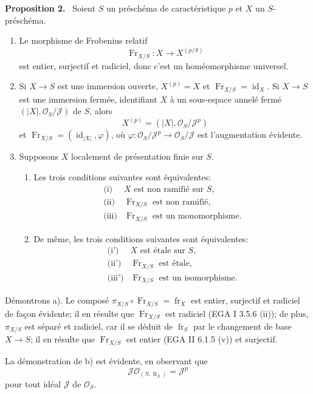 \documentclass[11pt]{article}
\newenvironment{statement}[1]{\par\medskip\noindent\textbf{#1.}\ }{\par\medskip}
\providecommand{\OO}{\mathcal{O}}
\providecommand{\id}{\operatorname{id}}
\providecommand{\id}{\operatorname{id}}
\providecommand{\id}{\operatorname{id}}
\providecommand{\id}{\operatorname{id}}
\providecommand{\id}{\operatorname{id}}
\providecommand{\fr}{\operatorname{fr}}
\providecommand{\Fr}{\operatorname{Fr}}
\providecommand{\JJ}{\mathcal J}
\providecommand{\Fr}{\operatorname{Fr}}
\providecommand{\fr}{\operatorname{fr}}
\providecommand{\id}{\operatorname{id}}
\begin{document}
\begin{statement}{Proposition 2}
Soient $S$ un préschéma de caractéristique $p$ et $X$ un $S$-préschéma.
\begin{enumerate}[label=\alph*)]
\item Le morphisme de Frobenius relatif
\[
\Fr_{X/S}:X\longrightarrow X^{(p/S)}
\]
est entier, surjectif et radiciel, donc c'est un homéomorphisme universel.

\item Si $X\to S$ est une immersion ouverte, $X^{(p)}=X$ et $\Fr_{X/S}=\id_X$. Si $X\to S$ est une immersion fermée, identifiant $X$ à un sous-espace annelé fermé $(|X|,\OO_S/\JJ)$ de $S$, alors
\[
X^{(p)}=(|X|,\OO_S/\JJ^p)
\]
et $\Fr_{X/S}=(\id_{|X|},\varphi)$, où $\varphi:\OO_S/\JJ^p\to\OO_S/\JJ$ est l'augmentation évidente.

\item Supposons $X$ localement de présentation finie sur $S$.
\begin{enumerate}[label=\arabic*)]
\item Les trois conditions suivantes sont équivalentes:
\[
\begin{array}{ll}
\text{(i)}& X\text{ est non ramifié sur }S,\\
\text{(ii)}& \Fr_{X/S}\text{ est non ramifié},\\
\text{(iii)}& \Fr_{X/S}\text{ est un monomorphisme}.
\end{array}
\]
\item De même, les trois conditions suivantes sont équivalentes:
\[
\begin{array}{ll}
\text{(i')}& X\text{ est étale sur }S,\\
\text{(ii')}& \Fr_{X/S}\text{ est étale},\\
\text{(iii')}& \Fr_{X/S}\text{ est un isomorphisme}.
\end{array}
\]
\end{enumerate}
\end{enumerate}
\end{statement}

Démontrons a). Le composé $\pi_{X/S}\circ\Fr_{X/S}=\fr_X$ est entier, surjectif et radiciel de façon évidente; il en résulte que $\Fr_{X/S}$ est radiciel (EGA I 3.5.6 (ii)); de plus, $\pi_{X/S}$ est séparé et radiciel, car il se déduit de $\fr_S$ par le changement de base $X\to S$; il en résulte que $\Fr_{X/S}$ est entier (EGA II 6.1.5 (v)) et surjectif.

La démonstration de b) est évidente, en observant que
\[
\JJ\OO_{(S,\fr_S)}=\JJ^p
\]
pour tout idéal $\JJ$ de $\OO_S$.
\end{document}
